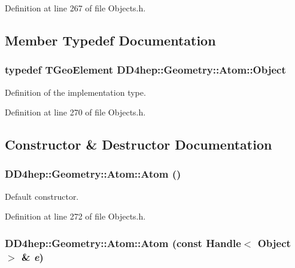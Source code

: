 Definition at line 267 of file Objects.h.

\subsection{Member Typedef Documentation}
\hypertarget{class_d_d4hep_1_1_geometry_1_1_atom_a9fdd9fe52048018b3cba23bc9fb855fd}{
\subsubsection[{Object}]{\setlength{\rightskip}{0pt plus 5cm}typedef TGeoElement {\bf DD4hep::Geometry::Atom::Object}}}
\label{class_d_d4hep_1_1_geometry_1_1_atom_a9fdd9fe52048018b3cba23bc9fb855fd}


Definition of the implementation type. 

Definition at line 270 of file Objects.h.

\subsection{Constructor \& Destructor Documentation}
\hypertarget{class_d_d4hep_1_1_geometry_1_1_atom_ac4b6668ca1e8fc3b021642f398f74d03}{
\subsubsection[{Atom}]{\setlength{\rightskip}{0pt plus 5cm}DD4hep::Geometry::Atom::Atom ()}}
\label{class_d_d4hep_1_1_geometry_1_1_atom_ac4b6668ca1e8fc3b021642f398f74d03}


Default constructor. 

Definition at line 272 of file Objects.h.\hypertarget{class_d_d4hep_1_1_geometry_1_1_atom_a60bf5f87d457ce7d265149f6a13c4c0f}{
\subsubsection[{Atom}]{\setlength{\rightskip}{0pt plus 5cm}DD4hep::Geometry::Atom::Atom (const {\bf Handle}$<$ {\bf Object} $>$ \& {\em e})}}
\label{class_d_d4hep_1_1_geometry_1_1_atom_a60bf5f87d457ce7d265149f6a13c4c0f}


